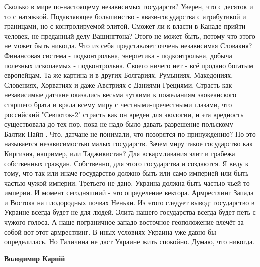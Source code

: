 \begin{itemize}
Сколько в мире по-настоящему независимых государств? Уверен, что с десяток и то
с натяжкой. Подавляющее большинство -  квази-государства с атрибутикой и
границами, но с контролируемой элитой. Сможет ли к власти в Канаде прийти
человек, не преданный делу Вашингтона? Этого не может быть, потому что этого не
может быть никогда. Что из себя представляет оччень независимая Словакия?
Финансовая система - подконтрольна, энергетика - подконтрольна, добыча полезных
ископаемых - подконтрольна. Своего ничего нет - всё продано богатым европейцам.
Та же картина и в других Болгариях, Румыниях, Македониях, Словениях, Хорватиях
и даже Австриях с Даниями-Грециями. Страсть как независимые датчане оказались
весьма чуткими к пожеланиям заокеанского старшего брата и врала всему миру с
честными-пречестными глазами, что российский "Севпоток-2" страсть как он вреден
для экологии, и эта вредность существовала до тех пор, пока не надо было давать
разрешение польскому Балтик Пайп . Что, датчане не понимали, что позорятся по
принуждению? Но это называется независимостью малых государств. Зачем миру
такое государство как Киргизия, например, или Таджикистан? Для вскармливания
элит и грабежа собственных граждан. Собственно, для этого государства и
создаются. Я веду к тому, что так или иначе государство должно быть или само
империей или быть частью чужой империи. Третьего не дано. Украина должна быть
частью чьей-то империи. И момент сегодняшний - это определение вектора.
Армрестлинг Запада и Востока на плодородных почвах Неньки. Из этого следует
вывод: государство в Украине всегда будет не для людей. Элита нашего
государства всегда будет петь с чужого голоса. А наше пограничное
западо-восточное геоположение влечёт за собой вот этот армрестлинг. В иных
условиях Украина уже давно бы определилась. Но Галичина не даст Украине жить
спокойно. Думаю, что никогда.

\begin{itemize}
 
\textbf{Володимир Карпій} 


\end{itemize}
\end{itemize}
